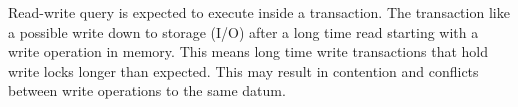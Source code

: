 
Read-write query is expected to execute inside a transaction. The transaction
like a possible write down to storage (I/O) after a long time read starting with
a write operation in memory. This means long time write transactions that hold
write locks longer than expected. This may result in contention and conflicts
between write operations to the same datum.



